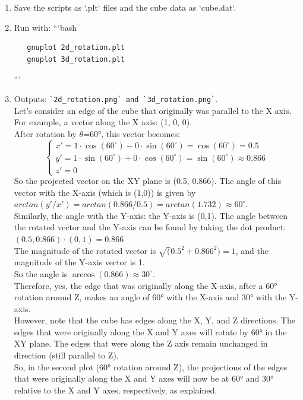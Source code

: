 \documentclass[a4paper,10pt]{article}
\begin{document}
\begin{enumerate}
\item Save the scripts as `.plt` files and the cube data as `cube.dat`.
\item Run with:
   ```bash\\
\begin{verbatim}
   gnuplot 2d_rotation.plt
   gnuplot 3d_rotation.plt
\end{verbatim}
   ```\\
\item Outputs: \verb|`2d_rotation.png` and `3d_rotation.png`|.\\
 Let's consider an edge of the cube that originally was parallel to the X axis. For example, a vector along the X axis: (1, 0, 0).\\
 After rotation by $\theta$=60°, this vector becomes:
 \[
\begin{cases}
   x' = 1 \cdot \cos(60^{\circ}) - 0 \cdot \sin(60^{\circ}) = \cos(60^{\circ}) = 0.5\\
   y' = 1 \cdot \sin(60^{\circ}) + 0 \cdot \cos(60^{\circ}) = \sin(60^{\circ}) \approx 0.866\\
   z' = 0
\end{cases}
 \]
So the projected vector on the XY plane is (0.5, 0.866). The angle of this vector with the X-axis (which is (1,0)) is given by \(arctan(y'/x') = arctan(0.866/0.5) = arctan(1.732) \approx 60^{\circ}\).\\
Similarly, the angle with the Y-axis: the Y-axis is (0,1). The angle between the rotated vector and the Y-axis can be found by taking the dot product:\\
\(   (0.5, 0.866) \cdot (0,1) = 0.866 \)\\
The magnitude of the rotated vector is \( \sqrt(0.5^2+0.866^2)=1\), and the magnitude of the Y-axis vector is 1.\\
So the angle is \(\arccos(0.866) \approx 30^{\circ}\).\\
Therefore, yes, the edge that was originally along the X-axis, after a 60° rotation around Z, makes an angle of 60° with the X-axis and 30° with the Y-axis.\\
However, note that the cube has edges along the X, Y, and Z directions. The edges that were originally along the X and Y axes will rotate by 60° in the XY plane. The edges that were along the Z axis remain unchanged in direction (still parallel to Z).\\
So, in the second plot (60° rotation around Z), the projections of the edges that were originally along the X and Y axes will now be at 60° and 30° relative to the X and Y axes, respectively, as explained.

\end{enumerate}
\end{document}
